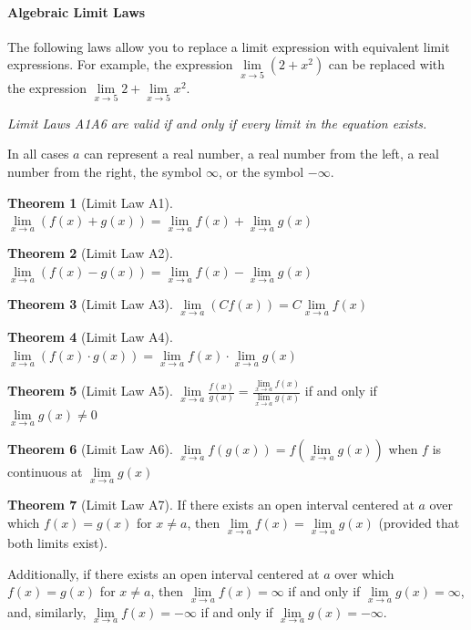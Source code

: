 \documentclass[12pt,]{book}
\theoremstyle{plain}
\theoremstyle{definition}
\numberwithin{equation}{section}
\newtheorem*{theorem*}{Theorem}
\newcommand{\fe}[2]{#1\mathopen{}\left(#2\right)\mathclose{}}
\begin{document}
\paragraph[Algebraic Limit Laws]{Algebraic Limit Laws}\label{paragraphs-76}
The following laws allow you to replace a limit expression with equivalent limit expressions. For example, the expression \(\lim\limits_{x\to5}\left(2+x^2\right)\) can be replaced with the expression \(\lim\limits_{x\to5}2+\lim\limits_{x\to5}x^2\).%
\par
\emph{Limit Laws A1\textendash{}A6 are valid if and only if every limit in the equation exists.}%
\par
In all cases \(a\) can represent a real number, a real number from the left, a real number from the right, the symbol \(\infty\), or the symbol \(-\infty\).%
\begin{theorem*}[Limit Law A1]\label{lla1}
\(\lim\limits_{x\to a}\left(\fe{f}{x}+\fe{g}{x}\right)=\lim\limits_{x\to a}\fe{f}{x}+\lim\limits_{x\to a}\fe{g}{x}\)%
\end{theorem*}
\begin{theorem*}[Limit Law A2]\label{lla2}
\(\lim\limits_{x\to a}\left(\fe{f}{x}-\fe{g}{x}\right)=\lim\limits_{x\to a}\fe{f}{x}-\lim\limits_{x\to a}\fe{g}{x}\)%
\end{theorem*}
\begin{theorem*}[Limit Law A3]\label{lla3}
\(\lim\limits_{x\to a}\left(C\fe{f}{x}\right)=C\lim\limits_{x\to a}\fe{f}{x}\)%
\end{theorem*}
\begin{theorem*}[Limit Law A4]\label{lla4}
\(\lim\limits_{x\to a}\left(\fe{f}{x}\cdot\fe{g}{x}\right)=\lim\limits_{x\to a}\fe{f}{x}\cdot\lim\limits_{x\to a}\fe{g}{x}\)%
\end{theorem*}
\begin{theorem*}[Limit Law A5]\label{lla5}
\(\lim\limits_{x\to a}\frac{\fe{f}{x}}{\fe{g}{x}}=\frac{\lim\limits_{x\to a}\fe{f}{x}}{\lim\limits_{x\to a}\fe{g}{x}}\) if and only if \(\lim\limits_{x\to a}\fe{g}{x}\neq0\)%
\end{theorem*}
\begin{theorem*}[Limit Law A6]\label{lla6}
\(\lim\limits_{x\to a}\fe{f}{\fe{g}{x}}=\fe{f}{\lim\limits_{x\to a}\fe{g}{x}}\) when \(f\) is continuous at \(\lim\limits_{x\to a}\fe{g}{x}\)%
\end{theorem*}
\begin{theorem*}[Limit Law A7]\label{lla7}
If there exists an open interval centered at \(a\) over which \(\fe{f}{x}=\fe{g}{x}\) for \(x\neq a\), then \(\lim\limits_{x\to a}\fe{f}{x}=\lim\limits_{x\to a}\fe{g}{x}\) (provided that both limits exist).%
\par
Additionally, if there exists an open interval centered at \(a\) over which \(\fe{f}{x}=\fe{g}{x}\) for \(x\neq a\), then \(\lim\limits_{x\to a}\fe{f}{x}=\infty\) if and only if \(\lim\limits_{x\to a}\fe{g}{x}=\infty\), and, similarly, \(\lim\limits_{x\to a}\fe{f}{x}=-\infty\) if and only if \(\lim\limits_{x\to a}\fe{g}{x}=-\infty\).%
\end{theorem*}
\typeout{************************************************}
\typeout{************************************************}
\end{document}
